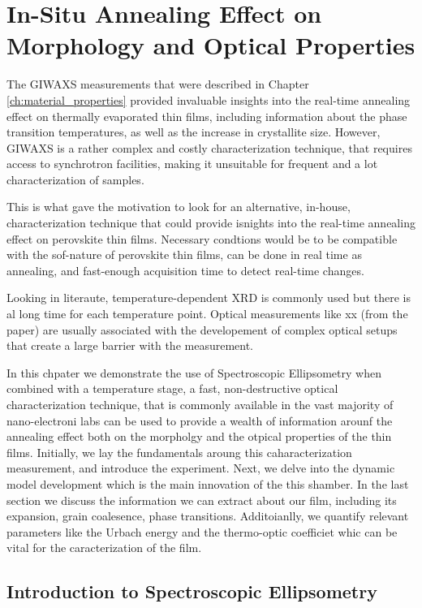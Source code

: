 \chapter{In-Situ Annealing Effect on Morphology and Optical Properties}\label{ch:ellipsometry}


The GIWAXS measurements that were described in Chapter \ref{ch:material_properties} provided invaluable insights into the real-time annealing effect on thermally evaporated  thin films, including information about the phase transition temperatures, as well as the increase in crystallite size. However, GIWAXS is a rather complex and costly characterization technique, that requires access to synchrotron facilities, making it unsuitable for frequent and a lot characterization of samples. 

This is what gave the motivation to look for an alternative, in-house, characterization technique that could provide isnights into the real-time annealing effect on perovskite thin films. Necessary condtions would be to be compatible with the sof-nature of perovskite thin films, can be done in real time as annealing, and fast-enough acquisition time to detect real-time changes. 

Looking in literaute, temperature-dependent XRD is commonly used but there is al long time for each temperature point. Optical measurements like xx (from the paper) are usually associated with the developement of complex optical setups that create a large barrier with the measurement. 

In this chpater we demonstrate the use of Spectroscopic Ellipsometry when combined with a temperature stage, a fast, non-destructive optical characterization technique, that is commonly available in the vast majority of nano-electroni labs can be used to provide a wealth of information arounf the annealing effect both on the morpholgy and the otpical properties of the thin films. 
Initially, we lay the fundamentals aroung this caharacterization measurement, and introduce the experiment. Next, we delve into the dynamic model development which is the main innovation of the this shamber. In the last section we discuss the information we can extract about our film, including its expansion, grain coalesence, phase transitions. Additoianlly, we quantify relevant parameters like the Urbach energy and the thermo-optic coefficiet whic can be vital for the caracterization of the film. 




\section{Introduction to Spectroscopic Ellipsometry} \label{ch:ellipsometry:intro}



